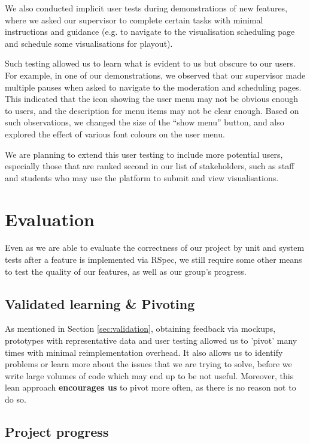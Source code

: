 \documentclass[a4paper]{article}
\begin{document}
We also conducted implicit user tests during demonstrations of new features, where we asked our supervisor to complete certain tasks with minimal instructions and guidance (e.g. to navigate to the visualisation scheduling page and schedule some visualisations for playout).

Such testing allowed us to learn what is evident to us but obscure to our users. For example, in one of our demonstrations, we observed that our supervisor made multiple pauses when asked to navigate to the moderation and scheduling pages. This indicated that the icon showing the user menu may not be obvious enough to users, and the description for menu items may not be clear enough. Based on such observations, we changed the size of the ``show menu'' button, and also explored the effect of various font colours on the user menu.

We are planning to extend this user testing to include more potential users, especially those that are ranked second in our list of stakeholders, such as staff and students who may use the platform to submit and 
view visualisations.

\section{Evaluation}

Even as we are able to evaluate the correctness of our project by unit and system tests after a feature is implemented via RSpec, we still require some other means to test the quality of our features, as well as our group's progress.

\subsection{Validated learning \& Pivoting}

As mentioned in Section \ref{sec:validation}, obtaining feedback via mockups, prototypes with representative data and user testing allowed us to 'pivot' many times with minimal reimplementation overhead. It also allows us to identify problems or learn more about the issues that we are trying to solve, before we write large volumes of code which may end up to be not useful. Moreover, this lean approach \textbf{encourages us} to pivot more often, as there is no reason not to do so.

\subsection{Project progress}
	
\end{document}
